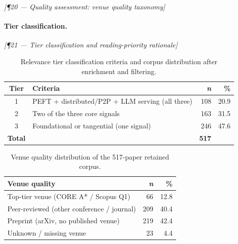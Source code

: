 \bigskip\noindent\textit{[¶20 — Quality assessment: venue quality taxonomy]}

\paragraph{Tier classification.}


\bigskip\noindent\textit{[¶21 — Tier classification and reading-priority rationale]}

\begin{table}[htbp]
  \centering
  \caption{Relevance tier classification criteria and corpus distribution
           after enrichment and filtering.}
  \label{tab:tiers}
  \begin{tabular}{clrr}
    \toprule
    \textbf{Tier} & \textbf{Criteria} & \textbf{\textit{n}} & \textbf{\%} \\
    \midrule
    1 & PEFT + distributed/P2P + LLM serving (all three) & 108 & 20.9 \\
    2 & Two of the three core signals                    & 163 & 31.5 \\
    3 & Foundational or tangential (one signal)          & 246 & 47.6 \\
    \midrule
    \textbf{Total} & & \textbf{517} & \\
    \bottomrule
  \end{tabular}
\end{table}

\begin{table}[htbp]
  \centering
  \caption{Venue quality distribution of the 517-paper retained corpus.}
  \label{tab:venue-quality}
  \begin{tabular}{lrr}
    \toprule
    \textbf{Venue quality} & \textbf{\textit{n}} & \textbf{\%} \\
    \midrule
    Top-tier venue (CORE A* / Scopus Q1)       &  66 & 12.8 \\
    Peer-reviewed (other conference / journal)  & 209 & 40.4 \\
    Preprint (arXiv, no published venue)        & 219 & 42.4 \\
    Unknown / missing venue                     &  23 &  4.4 \\
    \bottomrule
  \end{tabular}
\end{table}

